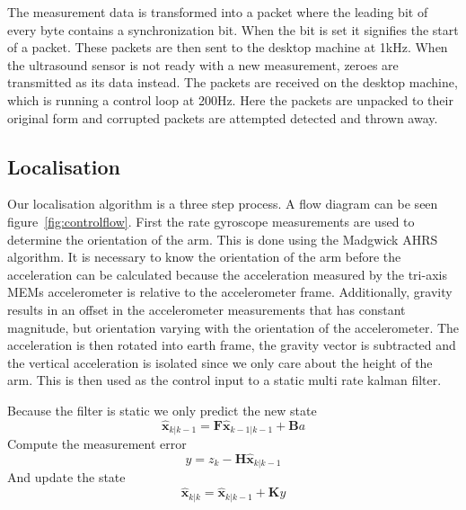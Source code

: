 The measurement data is transformed into a packet where the leading bit of every byte contains a synchronization bit. When
the bit is set it signifies the start of a packet. These packets are then sent to the desktop machine at 1kHz. When the ultrasound 
sensor is not ready with a new measurement, zeroes are transmitted as its data
instead.
The packets are received on the desktop machine, which is running a control loop at 200Hz. Here the packets are unpacked to their
original form and corrupted packets are attempted detected and thrown away.
\subsection{Localisation}\label{sec:localisation}
Our localisation algorithm is a three step process. A flow diagram can be seen figure~\ref{fig:controlflow}.
First the rate gyroscope measurements are used to determine the orientation of
the arm. This is done using the Madgwick AHRS algorithm\cite{Madgwick2011}. It
is necessary to know the orientation of the arm before
the acceleration can be calculated because the acceleration measured by the tri-axis MEMs accelerometer is relative to the 
accelerometer frame. Additionally, gravity results in an offset in the accelerometer measurements that has constant magnitude, but
orientation varying with the orientation of the accelerometer. The acceleration
is then rotated into earth frame, the gravity vector is subtracted and the
vertical acceleration is isolated since we only care about the height of the arm.
This is then used as the control input to a static multi rate kalman filter\cite{Welch2006}.

Because the filter is static we
only predict the new state 
\begin{equation*}
	\hat{\mathbf{x}}_{k\vert k-1} = \mathbf{F}\hat{\mathbf{x}}_{k-1\vert k-1} + \mathbf{B}a
\end{equation*}
Compute the measurement error 
\begin{equation*}
	y = z_k - \mathbf{H}\hat{\mathbf{x}}_{k\vert k-1} 
\end{equation*}
And update the state
\begin{equation*}
	\hat{\mathbf{x}}_{k\vert k} = \hat{\mathbf{x}}_{k\vert k-1} + \mathbf{K} y
\end{equation*}

